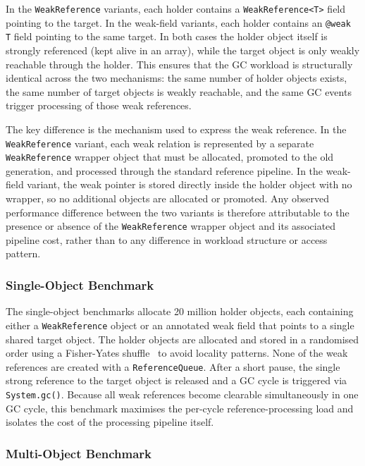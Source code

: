 In the \texttt{WeakReference} variants, each holder contains a \texttt{WeakReference<T>} field pointing to the target. In the weak-field variants, each holder contains an \texttt{@weak T} field pointing to the same target. In both cases the holder object itself is strongly referenced (kept alive in an array), while the target object is only weakly reachable through the holder. This ensures that the \ac{GC} workload is structurally identical across the two mechanisms: the same number of holder objects exists, the same number of target objects is weakly reachable, and the same \ac{GC} events trigger processing of those weak references.

The key difference is the mechanism used to express the weak reference. In the \texttt{WeakReference} variant, each weak relation is represented by a separate \texttt{WeakReference} wrapper object that must be allocated, promoted to the old generation, and processed through the standard reference pipeline. In the weak-field variant, the weak pointer is stored directly inside the holder object with no wrapper, so no additional objects are allocated or promoted. Any observed performance difference between the two variants is therefore attributable to the presence or absence of the \texttt{WeakReference} wrapper object and its associated pipeline cost, rather than to any difference in workload structure or access pattern.

\subsubsection{Single-Object Benchmark}
\label{subsubsec:eval-benchmarks-single}

The single-object benchmarks allocate 20 million holder objects, each containing either a \texttt{WeakReference} object or an annotated weak field that points to a single shared target object. The holder objects are allocated and stored in a randomised order using a Fisher-Yates shuffle~\cite{knuth97-taocp2} to avoid locality patterns. None of the weak references are created with a \texttt{ReferenceQueue}. After a short pause, the single strong reference to the target object is released and a \ac{GC} cycle is triggered via \texttt{System.gc()}. Because all weak references become clearable simultaneously in one \ac{GC} cycle, this benchmark maximises the per-cycle reference-processing load and isolates the cost of the processing pipeline itself.

\subsubsection{Multi-Object Benchmark}
\label{subsubsec:eval-benchmarks-multi}

